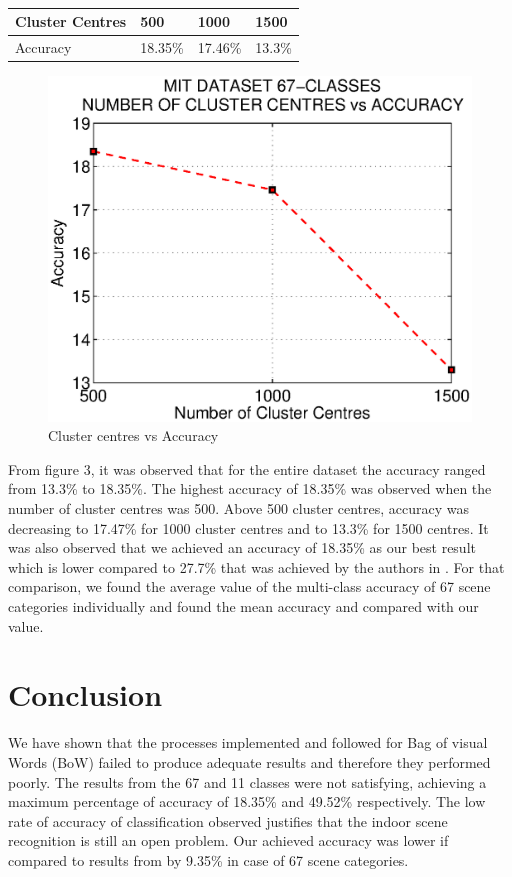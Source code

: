 \documentclass[10pt,twocolumn,letterpaper]{article}
\begin{document}
\begin{table}[h]
\caption{}
\begin{tabular}{|l|l|l|l|}
\hline
Cluster Centres & 500 & 1000 & 1500 \\ \hline
Accuracy & 18.35\% & 17.46\% & 13.3\% \\ \hline
\end{tabular}
\end{table}
\begin{figure}[h]
      \centering
      \includegraphics[width=0.8\linewidth]{img/67c.eps}
      \caption{Cluster centres vs Accuracy}
\end{figure}
From figure 3, it was observed that for the entire dataset the accuracy ranged from 13.3\% to 18.35\%. The highest accuracy of 18.35\% was observed when the number of cluster centres was 500. Above 500 cluster centres, accuracy was decreasing to 17.47\% for 1000 cluster centres and to 13.3\% for 1500 centres.  It was also observed that we achieved an accuracy of 18.35\% as our best result which is lower compared to 27.7\% that was achieved by the authors in \cite{indoorScenes}. For that comparison, we found the average value of the multi-class accuracy of 67 scene categories individually and found the mean accuracy and compared with our value. 

\section{Conclusion}
We have shown that the processes implemented and followed for Bag of visual Words (BoW) failed to produce adequate results and therefore they performed poorly.
The results from the 67  and 11 classes were not satisfying, achieving a maximum percentage of accuracy of 18.35\% and 49.52\% respectively. The low rate of accuracy of classification observed justifies that the indoor scene recognition is still an open problem. Our achieved accuracy was lower if compared to results from \cite{indoorScenes}  by 9.35\% in case of 67 scene categories.
{\small


}
\end{document}
